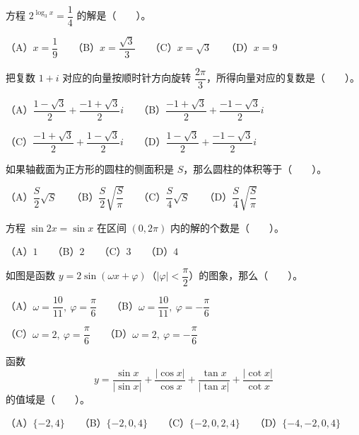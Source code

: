 \begin{question}
方程 $2^{\log_3 x}=\dfrac14$ 的解是\mbox{（　　）}。

（A）$x=\dfrac19$　　（B）$x=\dfrac{\sqrt3}{3}$　　（C）$x=\sqrt3$　　（D）$x=9$

\end{question}
\begin{question}
把复数 $1+i$ 对应的向量按顺时针方向旋转 $\dfrac{2\pi}{3}$，所得向量对应的复数是\mbox{（　　）}。

（A）$\dfrac{1-\sqrt3}{2}+\dfrac{-1+\sqrt3}{2}i$　　（B）$\dfrac{-1+\sqrt3}{2}+\dfrac{-1-\sqrt3}{2}i$

（C）$\dfrac{-1+\sqrt3}{2}+\dfrac{1-\sqrt3}{2}i$　　（D）$\dfrac{1-\sqrt3}{2}+\dfrac{-1-\sqrt3}{2}i$

\end{question}
\begin{question}
如果轴截面为正方形的圆柱的侧面积是 $S$，那么圆柱的体积等于\mbox{（　　）}。

（A）$\dfrac S2\sqrt S$　　（B）$\dfrac S2\sqrt{\dfrac S\pi}$　　（C）$\dfrac S4\sqrt S$　　（D）$\dfrac S4\sqrt{\dfrac S\pi}$

\end{question}
\begin{question}
方程 $\sin 2x=\sin x$ 在区间 $(0,2\pi)$ 内的解的个数是\mbox{（　　）}。

（A）$1$　　（B）$2$　　（C）$3$　　（D）$4$

\Needspace{0.4\textheight}
\end{question}
\begin{question}
如图是函数 $y=2\sin(\omega x+\varphi)$（$|\varphi|<\dfrac\pi2$）的图象，那么\mbox{（　　）}。
\nopagebreak[4]
\begin{center}\end{center}
\nopagebreak[4]
（A）$\omega=\dfrac{10}{11},\ \varphi=\dfrac\pi6$　　（B）$\omega=\dfrac{10}{11},\ \varphi=-\dfrac\pi6$

（C）$\omega=2,\ \varphi=\dfrac\pi6$　　（D）$\omega=2,\ \varphi=-\dfrac\pi6$

\end{question}
\begin{question}
函数
\nopagebreak[4]
\[
y=\frac{\sin x}{|\sin x|}+\frac{|\cos x|}{\cos x}+\frac{\tan x}{|\tan x|}+\frac{|\cot x|}{\cot x}
\]
的值域是\mbox{（　　）}。

（A）$\{-2,4\}$　　（B）$\{-2,0,4\}$　　（C）$\{-2,0,2,4\}$　　（D）$\{-4,-2,0,4\}$

\end{question}
